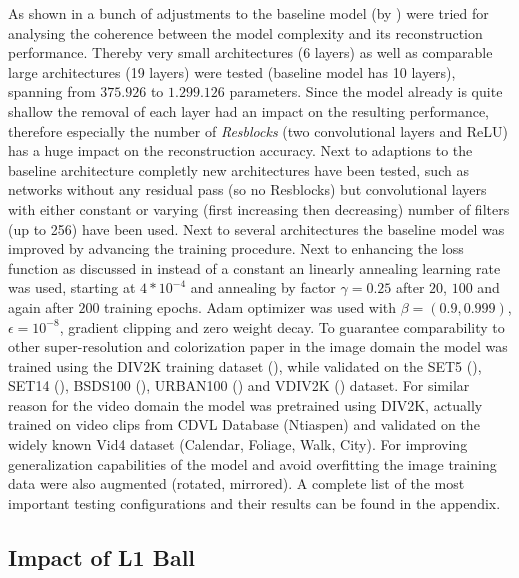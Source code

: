 As shown in  a bunch of adjustments to the
baseline model (by \cite{TAID}) were tried for analysing the coherence between
the model complexity and its reconstruction performance. Thereby very small
architectures (6 layers) as well as comparable large architectures
(19 layers) were tested (baseline model has 10 layers), spanning
from $375.926$ to $1.299.126$ parameters. Since the model already is quite
shallow the removal of each layer had an impact on the resulting performance,
therefore especially the number of \textit{Resblocks} (two convolutional layers
and ReLU) has a huge impact on the reconstruction accuracy. Next to adaptions
to the baseline architecture completly new architectures have been tested, such
as networks without any residual pass (so no Resblocks) but convolutional layers
with either constant or varying (first increasing then decreasing) number of
filters (up to 256) have been used.
\newline
Next to several architectures the baseline model was improved by advancing the
training procedure. Next to enhancing the loss function as discussed in
 instead of a constant an linearly annealing learning
rate was used, starting at $4*10^{-4}$ and annealing by factor $\gamma = 0.25$
after $20$, $100$ and again after $200$ training epochs. Adam optimizer was used
with $\beta = (0.9, 0.999)$, $\epsilon = 10^{-8}$, gradient clipping and  zero
weight decay.
\newline
To guarantee comparability to other super-resolution and colorization paper
in the image domain the model was trained using the DIV2K training dataset
(\cite{DIV2K}), while validated on the SET5 (\cite{SET5}), SET14 (\cite{SET14}),
BSDS100 (\cite{BSDS100}), URBAN100 (\cite{URBAN100}) and VDIV2K (\cite{DIV2K})
dataset. For similar reason for the video domain the model was pretrained using
DIV2K, actually trained on video clips from CDVL Database (Ntiaspen) and
validated on the widely known Vid4 dataset (Calendar, Foliage, Walk, City).
For improving generalization capabilities of the model and avoid overfitting
the image training data were also augmented (rotated, mirrored).
\newline
A complete list of the most important testing configurations and their results
can be found in the appendix.

\subsection{Impact of L1 Ball}
\label{sec:Experiments_EPS_BALL}



